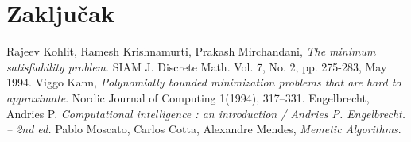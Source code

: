 \documentclass[12pt, a4paper]{article}
\theoremstyle{definition}
\begin{document}
\section{Zaključak}

\newpage

\begin{thebibliography}{9}
Rajeev Kohlit, Ramesh Krishnamurti, Prakash Mirchandani, \emph{The minimum satisfiability problem}. SIAM J. Discrete Math. Vol. 7, No. 2, pp. 275-283, May 1994.
Viggo Kann, \emph{Polynomially bounded minimization problems that are hard to approximate}. Nordic Journal of Computing 1(1994), 317–331.
Engelbrecht, Andries P. \emph{Computational intelligence : an introduction / Andries P. Engelbrecht. – 2nd ed.}
Pablo Moscato, Carlos Cotta, Alexandre Mendes, \emph{Memetic Algorithms}. 
\end{thebibliography}
\end{document}
